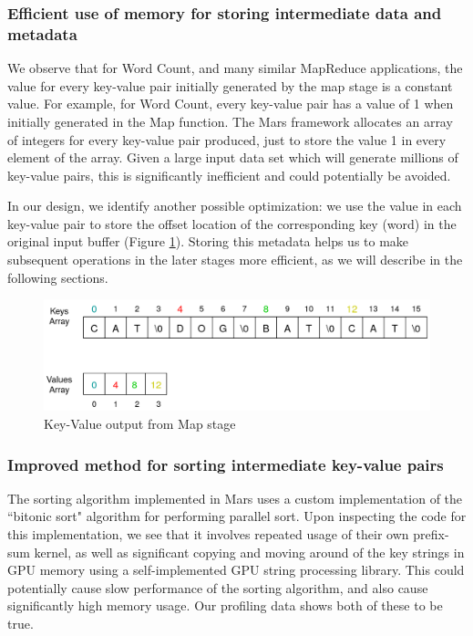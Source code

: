 \documentclass{article}
\begin{document}
\subsubsection{Efficient use of memory for storing intermediate data and metadata} \label{efficient-metadata}
We observe that for Word Count, and many similar MapReduce applications, the value for every key-value pair initially generated by the map stage is a constant value. For example, for Word Count, every key-value pair has a value of 1 when initially generated in the Map function. The Mars framework allocates an array of integers for every key-value pair produced, just to store the value 1 in every element of the array. Given a large input data set which will generate millions of key-value pairs, this is significantly inefficient and could potentially be avoided. 

In our design, we identify another possible optimization: we use the value in each key-value pair to store the offset location of the corresponding key (word) in the original input buffer (Figure \ref{fig:map-kv-out}). Storing this metadata helps us to make subsequent operations in the later stages more efficient, as we will describe in the following sections. 

\begin{figure}[h]
    \centering
    \includegraphics[width=0.9\linewidth]{images/map-kv-out.png}
    \caption{Key-Value output from Map stage}
    \label{fig:map-kv-out}
\end{figure}

\subsubsection{Improved method for sorting intermediate key-value pairs}
The sorting algorithm implemented in Mars uses a custom implementation of the ``bitonic sort" algorithm for performing parallel sort. Upon inspecting the code for this implementation, we see that it involves repeated usage of their own prefix-sum kernel, as well as significant copying and moving around of the key strings in GPU memory using a self-implemented GPU string processing library.  This could potentially cause slow performance of the sorting algorithm, and also cause significantly high memory usage. Our profiling data shows both of these to be true.
\end{document}
